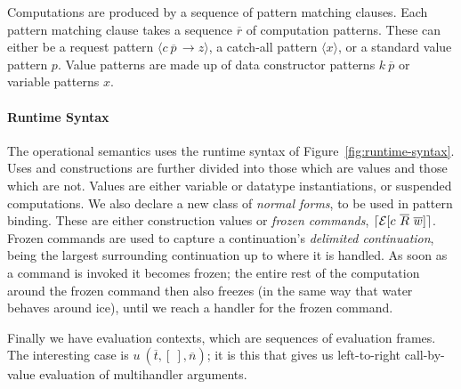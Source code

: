 \documentclass[msc,deptreport,cs]{infthesis} %
\DeclarePairedDelimiter{\ceil}{\lceil}{\rceil}
\newcommand{\many}{\overline}
\newcommand{\handleSymbol}{\rightarrow}
\newcommand{\handle}[2]{{#1} \handleSymbol {#2}}
\newcommand{\effin}[1]{\langle {#1} \rangle}
\newcommand{\EC}{\mathcal{E}}
\newcommand{\freeze}{\ceil}
\begin{document}
Computations are produced by a sequence of pattern matching clauses. Each
pattern matching clause takes a sequence $\many{r}$ of computation patterns.
These can either be a request pattern $\effin{\handle{c~\many{p}\,}{z}}$, a
catch-all pattern $\effin{x}$, or a standard value pattern $p$. Value patterns
are made up of data constructor patterns $k~\many{p}$ or variable patterns $x$.

\paragraph*{Runtime Syntax}

The operational semantics uses the runtime syntax of
Figure~\ref{fig:runtime-syntax}.
%
Uses and constructions are further divided into those which are values and those
which are not. Values are either variable or datatype instantiations, or
suspended computations.
%
We also declare a new class of \emph{normal forms}, to be used in pattern
binding. These are either construction values or \emph{frozen commands},
$\freeze{\EC[c~\many{R}~\many{w}]}$.
%
Frozen commands are used to capture a continuation's \emph{delimited
  continuation}, being the largest surrounding continuation up to where it is
handled. As soon as a command is invoked it becomes frozen; the entire rest of
the computation around the frozen command then also freezes (in the same way
that water behaves around ice), until we reach a handler for the frozen command.

Finally we have evaluation contexts, which are sequences of evaluation frames.
The interesting case is $u~(\many{t}, [~],\many{n})$; it is this that gives us
left-to-right call-by-value evaluation of multihandler arguments.
\end{document}
